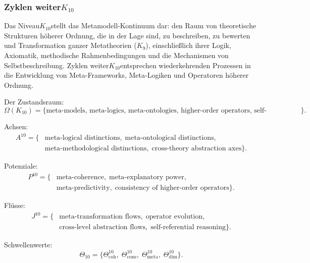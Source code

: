 
\subsubsection{Zyklen weiter$K_{10}$}
\label{sec:cycles-k10}

Das Niveau$K_{10}$stellt das Metamodell-Kontinuum dar: den Raum von
theoretische Strukturen höherer Ordnung, die in der Lage sind, zu beschreiben, zu bewerten und
Transformation ganzer Metatheorien ($K_9$), einschließlich ihrer Logik,
Axiomatik, methodische Rahmenbedingungen und die Mechanismen von
Selbstbeschreibung. Zyklen weiter$K_{10}$entsprechen wiederkehrenden Prozessen in
die Entwicklung von Meta-Frameworks, Meta-Logiken und Operatoren höherer Ordnung.

Der Zustandsraum:
\[
  \Omega(K_{10})
  = \{\text{meta-models, meta-logics, meta-ontologies, 
      higher-order operators, self-descriptions}\}.
\]

Achsen:
\[
  \begin{aligned}
A^{10}
  = \{&
    \text{meta-logical distinctions},\;
    \text{meta-ontological distinctions},\\
    &\text{meta-methodological distinctions},\;
    \text{cross-theory abstraction axes}
  \}.
  \end{aligned}
\]

Potenziale:
\[
  \begin{aligned}
P^{10}
   = \{&
      \text{meta-coherence},\;
      \text{meta-explanatory power},\\
      &\text{meta-predictivity},\;
      \text{consistency of higher-order operators}
    \}.
  \end{aligned}
\]

Flüsse:
\[
  \begin{aligned}
J^{10}
   = \{&
       \text{meta-transformation flows},\;
       \text{operator evolution},\\
       &\text{cross-level abstraction flows},\;
       \text{self-referential reasoning}
     \}.
  \end{aligned}
\]

Schwellenwerte:
\[
  \Theta_{10}
  = \{
       \Theta^{10}_\mathrm{coh},\;
       \Theta^{10}_\mathrm{cons},\;
       \Theta^{10}_\mathrm{meta},\;
       \Theta^{10}_\mathrm{dim}
    \}.
\]

